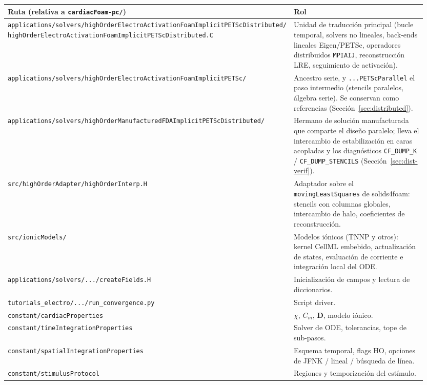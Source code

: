 \documentclass[11pt,a4paper]{article}
\newcommand{\code}[1]{\texttt{\small #1}}
\newcommand{\Dten}{\mathbf{D}}
\begin{document}
\begin{center}
\begin{tabular}{@{}p{0.55\linewidth}p{0.40\linewidth}@{}}
\toprule
Ruta (relativa a \code{cardiacFoam-pc/}) & Rol \\
\midrule
\code{applications/solvers/highOrderElectroActivationFoamImplicitPETScDistributed/}
   \code{highOrderElectroActivationFoamImplicitPETScDistributed.C}
   & Unidad de traducción principal (bucle temporal, solvers no lineales, back-ends
   lineales Eigen/PETSc, operadores distribuidos \code{MPIAIJ}, reconstrucción LRE,
   seguimiento de activación). \\
\code{applications/solvers/highOrderElectroActivationFoamImplicitPETSc/}
   & Ancestro serie, y \code{...PETScParallel} el paso intermedio (stencils
   paralelos, álgebra serie). Se conservan como referencias
   (Sección~\ref{sec:distributed}). \\
\code{applications/solvers/highOrderManufacturedFDAImplicitPETScDistributed/}
   & Hermano de solución manufacturada que comparte el diseño paralelo; lleva el
   intercambio de estabilización en caras acopladas y los diagnósticos
   \code{CF\_DUMP\_K} / \code{CF\_DUMP\_STENCILS}
   (Sección~\ref{sec:dist-verif}). \\
\code{src/highOrderAdapter/highOrderInterp.H} & Adaptador sobre el
   \code{movingLeastSquares} de solids4foam: stencils con columnas globales,
   intercambio de halo, coeficientes de reconstrucción. \\
\code{src/ionicModels/} & Modelos iónicos (TNNP y otros): kernel CellML embebido,
   actualización de states, evaluación de corriente e integración local del ODE. \\
\code{applications/solvers/.../createFields.H} & Inicialización de campos
   y lectura de diccionarios. \\
\code{tutorials\_electro/.../run\_convergence.py} & Script driver. \\
\code{constant/cardiacProperties} & $\chi$, $C_{m}$, $\Dten$,
   modelo iónico. \\
\code{constant/timeIntegrationProperties} & Solver de ODE, tolerancias,
   tope de sub-pasos. \\
\code{constant/spatialIntegrationProperties} & Esquema temporal, flags HO,
   opciones de JFNK / lineal / búsqueda de línea. \\
\code{constant/stimulusProtocol} & Regiones y temporización del estímulo. \\
\bottomrule
\end{tabular}
\end{center}
\end{document}
